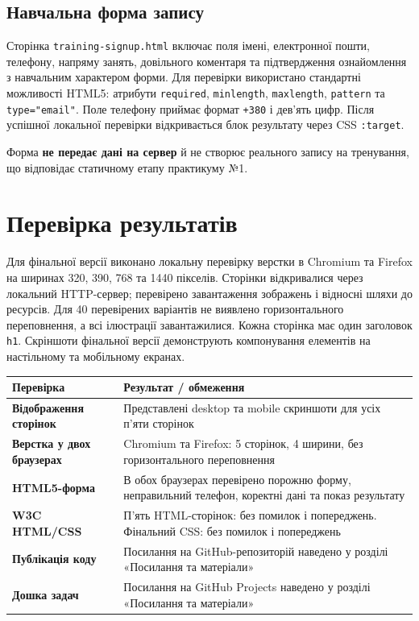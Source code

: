 \documentclass[12pt,a4paper]{article}
\newcommand{\file}[1]{\texttt{#1}}
\begin{document}
\subsection{Навчальна форма запису}
Сторінка \file{training-signup.html} включає поля імені, електронної пошти, телефону, напряму занять, довільного коментаря та підтвердження ознайомлення з навчальним характером форми. Для перевірки використано стандартні можливості HTML5: атрибути \file{required}, \file{minlength}, \file{maxlength}, \file{pattern} та \file{type="email"}. Поле телефону приймає формат \file{+380} і дев'ять цифр. Після успішної локальної перевірки відкривається блок результату через CSS \file{:target}.

Форма \textbf{не передає дані на сервер} й не створює реального запису на тренування, що відповідає статичному етапу практикуму №1.

\section{Перевірка результатів}
Для фінальної версії виконано локальну перевірку верстки в Chromium та Firefox на ширинах 320, 390, 768 та 1440 пікселів. Сторінки відкривалися через локальний HTTP-сервер; перевірено завантаження зображень і відносні шляхи до ресурсів. Для 40 перевірених варіантів не виявлено горизонтального переповнення, а всі ілюстрації завантажилися. Кожна сторінка має один заголовок \file{h1}. Скріншоти фінальної версії демонструють компонування елементів на настільному та мобільному екранах.

\noindent\begin{tabularx}{\textwidth}{>{\RaggedRight\arraybackslash\bfseries}p{48mm}X}
\toprule
Перевірка & Результат / обмеження\\
\midrule
Відображення сторінок & Представлені desktop та mobile скриншоти для усіх п'яти сторінок\\
Верстка у двох браузерах & Chromium та Firefox: 5 сторінок, 4 ширини, без горизонтального переповнення\\
HTML5-форма & В обох браузерах перевірено порожню форму, неправильний телефон, коректні дані та показ результату\\
W3C HTML/CSS & П’ять HTML-сторінок: без помилок і попереджень. Фінальний CSS: без помилок і попереджень\\
Публікація коду & Посилання на GitHub-репозиторій наведено у розділі «Посилання та матеріали»\\
Дошка задач & Посилання на GitHub Projects наведено у розділі «Посилання та матеріали»\\
\bottomrule
\end{tabularx}
\end{document}
